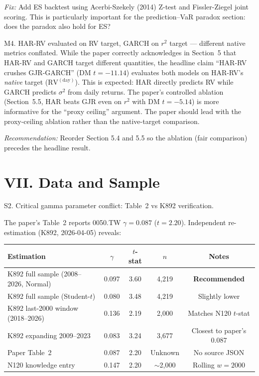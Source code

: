 \documentclass[12pt,a4paper]{article}
\begin{document}
\textit{Fix:} Add ES backtest using Acerbi-Szekely (2014) Z-test and Fissler-Ziegel joint scoring. This is particularly important for the prediction--VaR paradox section: does the paradox also hold for ES?

\textcolor{warncolor}{M4. HAR-RV evaluated on RV target, GARCH on $r^2$ target --- different native metrics conflated.} While the paper correctly acknowledges in Section~5 that HAR-RV and GARCH target different quantities, the headline claim ``HAR-RV crushes GJR-GARCH'' (DM $t = -11.14$) evaluates both models on HAR-RV's \textit{native} target ($\text{RV}^{(\text{day})}$). This is expected: HAR directly predicts RV while GARCH predicts $\sigma^2$ from daily returns. The paper's controlled ablation (Section~5.5, HAR beats GJR even on $r^2$ with DM $t = -5.14$) is more informative for the ``proxy ceiling'' argument. The paper should lead with the proxy-ceiling ablation rather than the native-target comparison.

\textit{Recommendation:} Reorder Section 5.4 and 5.5 so the ablation (fair comparison) precedes the headline result.


\section*{VII. Data and Sample}

\textcolor{errorred}{S2. Critical gamma parameter conflict: Table~2 vs K892 verification.}

The paper's Table~2 reports 0050.TW $\gamma = 0.087$ ($t = 2.20$). Independent re-estimation (K892, 2026-04-05) reveals:

\begin{center}
\begin{tabular}{lcccc}
\toprule
Estimation & $\gamma$ & $t$-stat & $n$ & Notes \\
\midrule
K892 full sample (2008--2026, Normal) & 0.097 & 3.60 & 4,219 & \textbf{Recommended} \\
K892 full sample (Student-$t$) & 0.080 & 3.48 & 4,219 & Slightly lower \\
K892 last-2000 window (2018--2026) & 0.136 & 2.19 & 2,000 & Matches N120 $t$-stat \\
K892 expanding 2009--2023 & 0.083 & 3.24 & 3,677 & Closest to paper's 0.087 \\
Paper Table~2 & 0.087 & 2.20 & Unknown & \textcolor{errorred}{No source JSON} \\
N120 knowledge entry & 0.147 & 2.20 & $\sim$2,000 & Rolling $w=2000$ \\
\bottomrule
\end{tabular}
\end{center}
\end{document}

